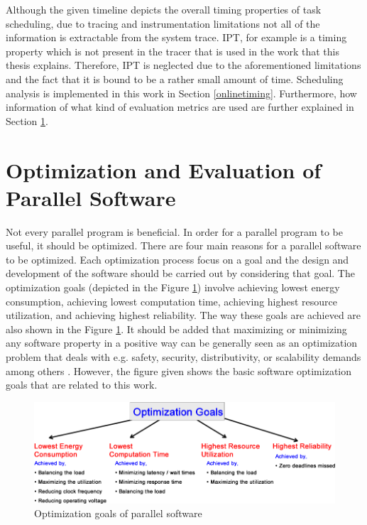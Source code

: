 Although the given timeline depicts the overall timing properties of task scheduling, due to tracing and instrumentation limitations not all of the information is extractable from the system trace. IPT, for example is a timing property which is not present in the tracer that is used in the work that this thesis explains. Therefore, IPT is neglected due to the aforementioned limitations and the fact that it is bound to be a rather small amount of time. Scheduling analysis is implemented in this work in Section \ref{onlinetiming}. Furthermore, how information of what kind of evaluation metrics are used are further explained in Section \ref{opt}.

\section{Optimization and Evaluation of Parallel Software} \label{opt}
Not every parallel program is beneficial. In order for a parallel program to be useful, it should be optimized. There are four main reasons for a parallel software to be optimized. Each optimization process focus on a goal and the design and development of the software should be carried out by considering that goal. The optimization goals (depicted in the Figure \ref{fig:optimization2})  involve achieving lowest energy consumption, achieving lowest computation time, achieving highest resource utilization, and achieving highest reliability. The way these goals are achieved are also shown in the Figure \ref{fig:optimization2}. It should be added that maximizing or minimizing any software property in a positive way can be generally seen as an optimization problem that deals with e.g. safety, security, distributivity, or scalability demands among others \cite{constrainedpaper}. However, the figure given shows the basic software optimization goals that are related to this work.

\begin{figure}[!ht]
	\centering
	\captionsetup{justification=centering}
	\includegraphics[width=\textwidth]{content/images/optimization2.png}
	\caption{Optimization goals of parallel software \cite{lukas1}}
	\label{fig:optimization2}
\end{figure}


